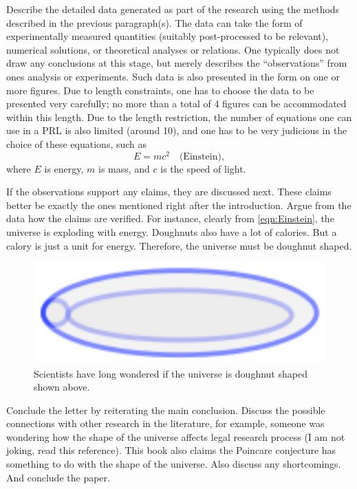 \documentclass[twocolumn,prl]{revtex4-1}
\begin{document}
Describe the detailed data generated as part of the research using the methods described in the previous paragraph(s). The data can take the form of experimentally measured quantities (suitably post-processed to be relevant), numerical solutions, or theoretical analyses or relations. One typically does not draw any conclusions at this stage, but merely describes the ``observations'' from ones analysis or experiments. Such data is also presented in the form on one or more figures. Due to length constraints, one has to choose the data to be presented very carefully; no more than a total of 4 figures can be accommodated within this length. Due to the length restriction, the number of equations one can use in a PRL is also limited (around 10), and one has to be very judicious in the choice of these equations, such as
\begin{equation}
E = m c^2 \quad \text{(Einstein)}, \label{eqn:Einstein}
\end{equation}
where $E$ is energy, $m$ is mass, and $c$ is the speed of light.

If the observations support any claims, they are discussed next. These claims better be exactly the ones mentioned right after the introduction. Argue from the data how the claims are verified. For instance, clearly from \eqref{eqn:Einstein}, the universe is exploding with energy. Doughnuts also have a lot of calories. But a calory is just a unit for energy. Therefore, the universe must be doughnut shaped.
\begin{figure}[htb]
\includegraphics{Figures/Schematic_Doughnut}
\caption{Scientists have long wondered if the universe is doughnut shaped shown above.}
\label{fig:Schematic_Doughnut}
\end{figure}


Conclude the letter by reiterating the main conclusion. Discuss the possible connections with other research in the literature, for example, someone was wondering how the shape of the universe affects legal research process\cite{mills2003shape} (I am not joking, read this reference). This book\cite{oshea2009poincare} also claims the Poincare conjecture has something to do with the shape of the universe. Also discuss any shortcomings. And conclude the paper. 

\end{document}
